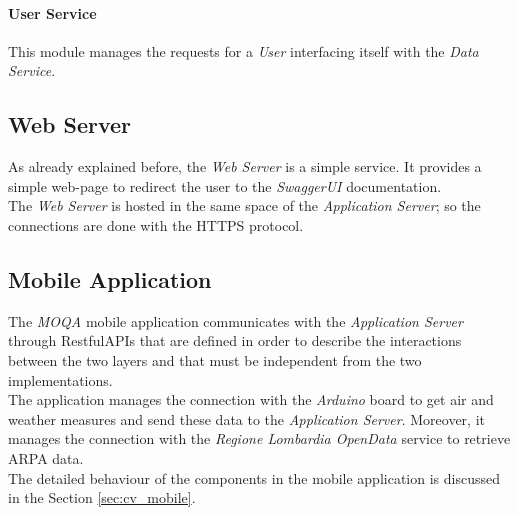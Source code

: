 \paragraph{User Service}
This module manages the requests for a \textit{User} interfacing itself with the \textit{Data Service}.

\subsection{Web Server}
As already explained before, the \textit{Web Server} is a simple service. It provides a simple web-page to redirect the user to the \textit{SwaggerUI} documentation.\\
The \textit{Web Server} is hosted in the same space of the \textit{Application Server}; so the connections are done with the HTTPS protocol.\\

\subsection{Mobile Application}
The \textit{MOQA} mobile application communicates with the \textit{Application Server} through RestfulAPIs that are defined in order to describe the interactions between the two layers and that must be independent from the two implementations.\\
The application manages the connection with the \textit{Arduino} board to get air and weather measures and send these data to the \textit{Application Server}. Moreover, it manages the connection with the \textit{Regione Lombardia OpenData} service to retrieve ARPA data.\\

The detailed behaviour of the components in the mobile application is discussed in the Section \ref{sec:cv_mobile}.

